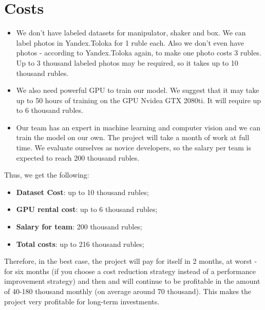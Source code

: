\section{Costs}

\begin{itemize}

\item We don't have labeled datasets for manipulator, shaker and box. We can label photos in Yandex.Toloka for 1 ruble each. Also we don't even have photos - according to Yandex.Toloka again, to make one photo costs 3 rubles. Up to 3 thousand labeled photos may be required, so it takes up to 10 thousand rubles.

\item We also need powerful GPU to train our model. We suggest that it may take up to 50 hours of training on the GPU Nvidea GTX 2080ti. It will require up to 6 thousand rubles.

\item Our team has an expert in machine learning and computer vision and we can train the model on our own. The project will take a month of work at full time. We evaluate ourselves as novice developers, so the salary per team is expected to reach 200 thousand rubles.
\end{itemize}
\newline
Thus, we get the following:
\begin{itemize}
    \item \textbf{Dataset Cost}: up to 10 thousand rubles;
    \item \textbf{GPU rental cost}: up to 6 thousand rubles;
    \item \textbf{Salary for team}: 200 thousand rubles;
    \item \textbf{Total costs}: up to 216 thousand rubles;
\end{itemize}
\newline
Therefore, in the best case, the project will pay for itself in 2 months, at worst - for six months (if you choose a cost reduction strategy instead of a performance improvement strategy) and then and will continue to be profitable in the amount of 40-180 thousand monthly (on average around 70 thousand). This makes the project very profitable for long-term investments.